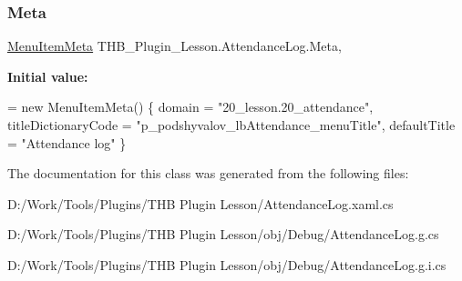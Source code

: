 \subsubsection{\texorpdfstring{Meta}{Meta}}
{\footnotesize\ttfamily \mbox{\hyperlink{class_uniform_client_1_1_plugins_1_1_menu_item_meta}{Menu\+Item\+Meta}} T\+H\+B\+\_\+\+Plugin\+\_\+\+Lesson.\+Attendance\+Log.\+Meta\hspace{0.3cm}{\ttfamily [get]}, {\ttfamily [set]}}

{\bfseries Initial value\+:}
\begin{DoxyCode}
= \textcolor{keyword}{new} MenuItemMeta()
        \{
            domain = \textcolor{stringliteral}{"20\_lesson.20\_attendance"},
            titleDictionaryCode = \textcolor{stringliteral}{"p\_podshyvalov\_lbAttendance\_menuTitle"},
            defaultTitle = \textcolor{stringliteral}{"Attendance log"}
        \}
\end{DoxyCode}


The documentation for this class was generated from the following files\+:\begin{DoxyCompactItemize}
\item 
D\+:/\+Work/\+Tools/\+Plugins/\+T\+H\+B Plugin Lesson/Attendance\+Log.\+xaml.\+cs\item 
D\+:/\+Work/\+Tools/\+Plugins/\+T\+H\+B Plugin Lesson/obj/\+Debug/Attendance\+Log.\+g.\+cs\item 
D\+:/\+Work/\+Tools/\+Plugins/\+T\+H\+B Plugin Lesson/obj/\+Debug/Attendance\+Log.\+g.\+i.\+cs\end{DoxyCompactItemize}
